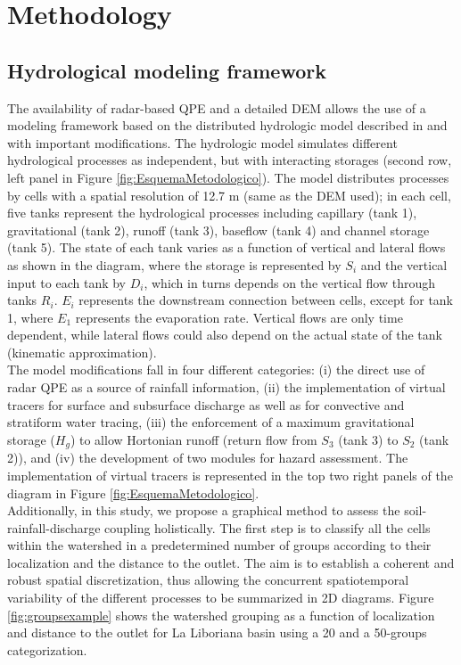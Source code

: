 \documentclass[hess, manuscript]{copernicus}
\begin{document}
\section{Methodology}
\label{sec:methods}

\subsection{Hydrological modeling framework}

The availability of radar-based QPE and a detailed DEM allows the use of a modeling framework based on the distributed hydrologic model described in \citet{Velez2001} and \citet{Frances2007b} with important modifications. The hydrologic model simulates different hydrological processes as independent, but with interacting storages (second row, left panel in Figure \ref{fig:EsquemaMetodologico}). The model distributes processes by cells with a spatial resolution of 12.7 m (same as the DEM used); in each cell, five tanks represent the hydrological processes including capillary (tank 1), gravitational (tank 2), runoff (tank 3), baseflow (tank 4) and channel storage (tank 5). The state of each tank varies as a function of vertical and lateral flows as shown in the diagram, where the storage is represented by $S_i$ and the vertical input to each tank by $D_i$, which in turns depends on the vertical flow through tanks $R_i$. $E_i$ represents the downstream connection between cells, except for tank 1, where $E_1$ represents the evaporation rate. Vertical flows are only time dependent, while lateral flows could also depend on the actual state of the tank (kinematic approximation).\\

The model modifications fall in four different categories: (i) the direct use of radar QPE as a source of rainfall information, (ii) the implementation of virtual tracers for surface and subsurface discharge as well as for convective and stratiform water tracing,  (iii) the enforcement of a maximum gravitational storage ($H_{g}$) to allow Hortonian runoff (return flow from $S_3$ (tank 3) to $S_2$ (tank 2)), and (iv) the development of two modules for hazard assessment. The implementation of virtual tracers is represented in the top two right panels of the diagram in Figure \ref{fig:EsquemaMetodologico}.\\

Additionally, in this study, we propose a graphical method to assess the soil-rainfall-discharge coupling holistically. The first step is to classify all the cells within the watershed in a predetermined number of groups according to their localization and the distance to the outlet. The aim is to establish a coherent and robust spatial discretization, thus allowing the concurrent spatiotemporal variability of the different processes to be summarized in 2D diagrams. Figure \ref{fig:groupsexample} shows the watershed grouping as a function of localization and distance to the outlet for La Liboriana basin using a 20 and a 50-groups categorization.\\
\end{document}
